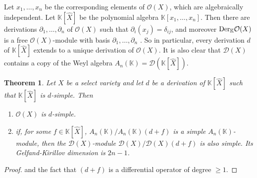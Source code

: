 \documentclass[12pt, a4paper]{amsart}
\newtheorem{theorem}{Theorem}[section]
\newtheorem{definition}[theorem]{Definition}
\newcommand{\Weyl}{A_n(\mathbb{K})} %
\def\k{\mathbb K}
\newcommand{\Der}{{\rm{Der}}}
\def\k{\mathbb K}
\newcommand{\gr}{{\rm gr}}
\def\D{\mathcal D}
\def\KK{\mathbb K}
\begin{document}
Let $x_1, \ldots, x_n$ be the corresponding elements of $\mathcal{O}(X)$, which are algebraically independent. Let $\KK[\widehat{X}]$ be the polynomial algebra $\KK[x_1,\ldots,x_n]$. Then there are derivations $\partial_1, \ldots, \partial_n$ of $\mathcal{O}(X)$ such that $\partial_i(x_j)=\delta_{ij}$, and moreover $\Der_\KK \mathcal{O}(X)$ is a free $\mathcal{O}(X)$-module with basis $\partial_1, \ldots, \partial_n$ \cite[Corollary 15.1.12]{McConnell}. So in particular, every derivation $d$ of $\KK[\widehat{X}]$ extends to a unique derivation of $\mathcal{O}(X)$. It is also clear that $\D(X)$ contains a copy of the Weyl algebra $\Weyl=\D(\KK[\widehat{X}])$.
\begin{theorem}\label{theorem-select-varieties}
    Let $X$ be a select variety and let $d$ be a derivation of $\KK[\widehat{X}]$ such that $\KK[\widehat{X}]$ is $d$-simple. Then
    \begin{enumerate}
    \item $\mathcal{O}(X)$ is $d$-simple.
    \item if, for some $f \in \KK[\widehat{X}]$, $\Weyl/\Weyl(d+f)$ is a simple $\Weyl$-module, then the $\D(X)$-module $\D(X)/\D(X)(d+f)$ is also simple. Its Gelfand-Kirillov dimension is $2n-1$.
    \end{enumerate}
\end{theorem}
\begin{proof}
    \cite[Theorem 2.2]{Coutinho0} and the fact that $(d+f)$ is a differential operator of degree $\geq 1$.
\end{proof}
\end{document}
